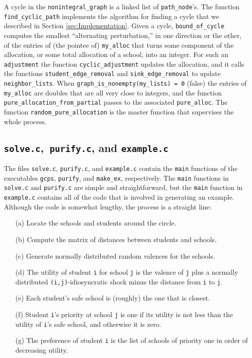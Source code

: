 \documentclass[12pt]{article}
\theoremstyle{definition}
\begin{document}
\begin{appendix}
A cycle in the \texttt{nonintegral\_graph} is a linked list of
\texttt{path\_node}'s.  The function \texttt{find\_cyclic\_path}
implements the algorithm for finding a cycle that we described in
Section \ref{sec:Implementation}.  Given a cycle,
\texttt{bound\_of\_cycle} computes the smallest ``alternating
perturbation,'' in one direction or the other, of the entries of (the
pointee of) \texttt{my\_alloc} that turns some component of the
allocation, or some total allocation of a school, into an integer.
For such an \texttt{adjustment} the function
\texttt{cyclic\_adjustment} updates the allocation, and it calls the
functions \texttt{student\_edge\_removal} and
\texttt{sink\_edge\_removal} to update \texttt{neighbor\_lists}.
When \texttt{graph\_is\_nonempty(my\_lists) = 0} (false) the entries
of \texttt{my\_alloc} are doubles that are all very close to integers,
and the function \texttt{pure\_allocation\_from\_partial} passes to
the associated \texttt{pure\_alloc}.  The function
\texttt{random\_pure\_allocation} is the master function that
supervises the whole process.

\subsection{\texttt{solve.c},\  \texttt{purify.c}, and \texttt{example.c}}

The files \texttt{solve.c}, \texttt{purify.c}, and \texttt{example.c}
contain the \texttt{main} functions of the executables \texttt{gcps},
\texttt{purify}, and \texttt{make\_ex}, respectively.  The
\texttt{main} functions in \texttt{solve.c} and \texttt{purify.c} are
simple and straightforward, but the \texttt{main} function in
\texttt{example.c} contains all of the code that is involved in
generating an example.  Although the code is somewhat lengthy, the
process is a straight line:
\begin{enumerate}
  \item[(a)] Locate the schools and students around the circle.
  \item[(b)] Compute the matrix of distances between students and schools.
  \item[(c)] Generate normally distributed random valences for the schools.
  \item[(d)] The utility of student \texttt{i} for school \texttt{j}
    is the valence of \texttt{j} plus a normally distributed
    \texttt{(i,j)}-idiosyncratic shock minus the distance from
    \texttt{i} to \texttt{j}.
  \item[(e)] Each student's safe school is (roughly) the one that is closest.
  \item[(f)] Student \texttt{i}'s priority at school \texttt{j} is one
    if its utility is not less than the utility of \texttt{i}'s safe
    school, and otherwise it is zero.
  \item[(g)] The preference of student \texttt{i} is the list of
    schools of priority one in order of decreasing utility.
\end{enumerate}

\end{appendix}
\end{document}
